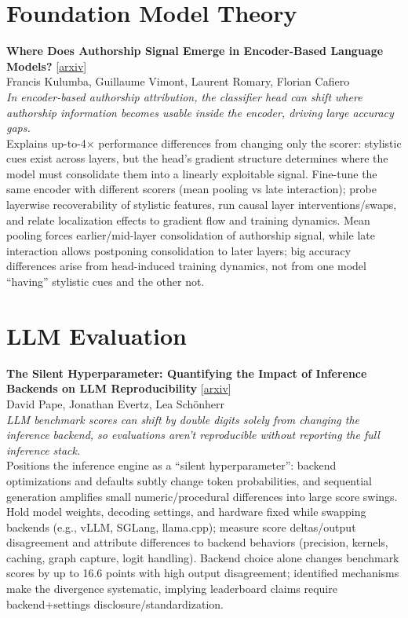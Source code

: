 \documentclass[12pt,letterpaper]{article}
\begin{document}
\medskip


\section*{Foundation Model Theory}

{\small\textbf{Where Does Authorship Signal Emerge in Encoder-Based Language Models?}} {\scriptsize[\href{https://arxiv.org/abs/2605.19908}{arxiv}]}\\
{\scriptsize Francis Kulumba, Guillaume Vimont, Laurent Romary, Florian Cafiero}\\

{\small\textit{In encoder-based authorship attribution, the classifier head can shift where authorship information becomes usable inside the encoder, driving large accuracy gaps.}}\\[1pt]
{\footnotesize Explains up-to-4× performance differences from changing only the scorer: stylistic cues exist across layers, but the head's gradient structure determines where the model must consolidate them into a linearly exploitable signal. Fine-tune the same encoder with different scorers (mean pooling vs late interaction); probe layerwise recoverability of stylistic features, run causal layer interventions/swaps, and relate localization effects to gradient flow and training dynamics. Mean pooling forces earlier/mid-layer consolidation of authorship signal, while late interaction allows postponing consolidation to later layers; big accuracy differences arise from head-induced training dynamics, not from one model ``having'' stylistic cues and the other not.}

\medskip


\section*{LLM Evaluation}

{\small\textbf{The Silent Hyperparameter: Quantifying the Impact of Inference Backends on LLM Reproducibility}} {\scriptsize[\href{https://arxiv.org/abs/2605.19537}{arxiv}]}\\
{\scriptsize David Pape, Jonathan Evertz, Lea Sch\"onherr}\\

{\small\textit{LLM benchmark scores can shift by double digits solely from changing the inference backend, so evaluations aren't reproducible without reporting the full inference stack.}}\\[1pt]
{\footnotesize Positions the inference engine as a ``silent hyperparameter'': backend optimizations and defaults subtly change token probabilities, and sequential generation amplifies small numeric/procedural differences into large score swings. Hold model weights, decoding settings, and hardware fixed while swapping backends (e.g., vLLM, SGLang, llama.cpp); measure score deltas/output disagreement and attribute differences to backend behaviors (precision, kernels, caching, graph capture, logit handling). Backend choice alone changes benchmark scores by up to 16.6 points with high output disagreement; identified mechanisms make the divergence systematic, implying leaderboard claims require backend+settings disclosure/standardization.}
\end{document}
